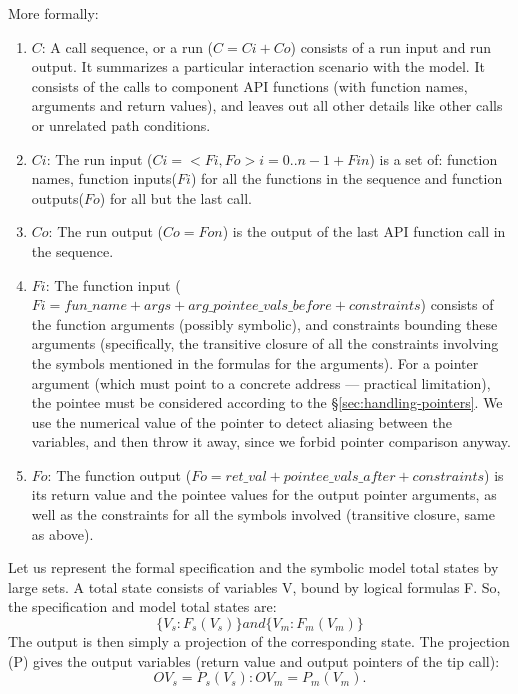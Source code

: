 \documentclass[letterpaper,twocolumn,10pt]{article}
\begin{document}
More formally:
\begin{enumerate}
\item \(C\): A call sequence, or a run (\(C=Ci+Co\)) consists of a run input and
  run output. It summarizes a particular interaction scenario with the model. It
  consists of the calls to component API functions (with function names,
  arguments and return values), and leaves out all other details like other
  calls or unrelated path conditions.
\item \(Ci\): The run input (\(Ci = <Fi,Fo>i=0..n-1 + Fin\)) is a set of:
  function names, function inputs(\(Fi\)) for all the functions in the sequence
  and function outputs(\(Fo\)) for all but the last call.
\item \(Co\): The run output (\(Co = Fon\)) is the output of the last API
  function call in the sequence.
\item \(Fi\): The function input (\(Fi = fun\_name + args +
  arg\_pointee\_vals\_before + constraints\)) consists of the function arguments
  (possibly symbolic), and constraints bounding these arguments (specifically,
  the transitive closure of all the constraints involving the symbols mentioned
  in the formulas for the arguments). For a pointer argument (which must point
  to a concrete address --- practical limitation), the pointee must be
  considered according to the \S\ref{sec:handling-pointers}. We use the
  numerical value of the pointer to detect aliasing between the variables, and
  then throw it away, since we forbid pointer comparison anyway.
\item \(Fo\): The function output (\(Fo = ret\_val + pointee\_vals\_after +
  constraints\)) is its return value and the pointee values for the output
  pointer arguments, as well as the constraints for all the symbols involved
  (transitive closure, same as above).
\end{enumerate}

Let us represent the formal specification and the symbolic model total states by
large sets. A total state consists of variables V, bound by logical formulas F.
So, the specification and model total states are:
\[
\{V_s : F_s(V_s)\} and \{V_m : F_m(V_m)\}
\]
The output is then simply a projection of the corresponding state. The
projection (P) gives the output variables (return value and output pointers of
the tip call):
\[
OV_s = P_s(V_s): OV_m = P_m(V_m).
\]
\end{document}
